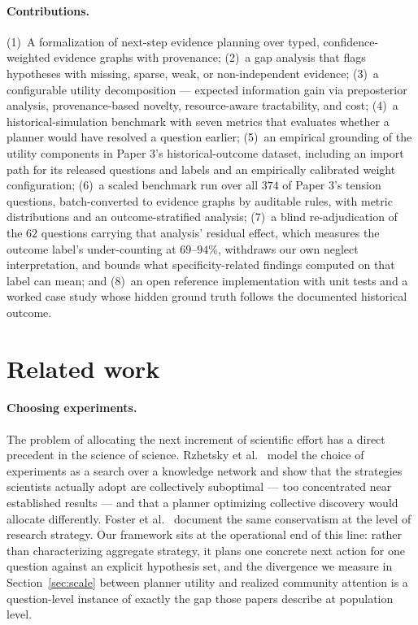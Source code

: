 \documentclass[11pt]{article}
\begin{document}
\paragraph{Contributions.}
(1)~A formalization of next-step evidence planning over typed,
confidence-weighted evidence graphs with provenance;
(2)~a gap analysis that flags hypotheses with missing, sparse, weak, or
non-independent evidence;
(3)~a configurable utility decomposition --- expected information gain via
preposterior analysis, provenance-based novelty, resource-aware
tractability, and cost;
(4)~a historical-simulation benchmark with seven metrics that evaluates
whether a planner would have resolved a question earlier;
(5)~an empirical grounding of the utility components in Paper 3's
historical-outcome dataset, including an import path for its released
questions and labels and an empirically calibrated weight
configuration;
(6)~a scaled benchmark run over all $374$ of Paper 3's tension
questions, batch-converted to evidence graphs by auditable rules, with
metric distributions and an outcome-stratified analysis;
(7)~a blind re-adjudication of the $62$ questions carrying that
analysis' residual effect, which measures the outcome label's
under-counting at $69$--$94\%$, withdraws our own neglect
interpretation, and bounds what specificity-related findings computed
on that label can mean; and
(8)~an open reference implementation with unit tests and a worked case
study whose hidden ground truth follows the documented historical
outcome.

\section{Related work}

\paragraph{Choosing experiments.} The problem of allocating the next
increment of scientific effort has a direct precedent in the science of
science. Rzhetsky et al.~\cite{rzhetsky2015} model the choice of
experiments as a search over a knowledge network and show that the
strategies scientists actually adopt are collectively suboptimal ---
too concentrated near established results --- and that a planner
optimizing collective discovery would allocate differently. Foster et
al.~\cite{foster2015} document the same conservatism at the level of
research strategy. Our framework sits at the operational end of this
line: rather than characterizing aggregate strategy, it plans one
concrete next action for one question against an explicit hypothesis
set, and the divergence we measure in Section~\ref{sec:scale} between
planner utility and realized community attention is a question-level
instance of exactly the gap those papers describe at population level.
\end{document}
